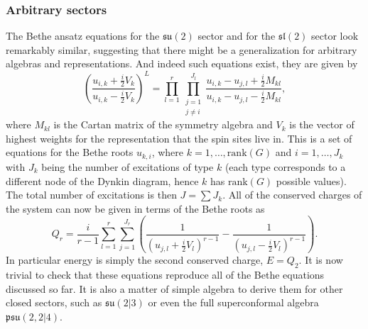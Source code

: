 \subsubsection{Arbitrary sectors}

The Bethe ansatz equations for the $\mathfrak{su}(2)$ sector  and for the $\mathfrak{sl}(2)$ sector  look remarkably similar, suggesting that there might be a generalization for arbitrary algebras and representations.
And indeed such equations exist, they are given by \cite{Saleur:2000kk} 
\begin{equation}
	\left( \frac{u_{i,k} + \frac{i}{2} V_{k}}{u_{i,k} - \frac{i}{2} V_{k}} \right)^L = \prod_{l=1}^r \prod_{\substack{j=1 \\ j \neq i}}^{J_l} \frac{u_{i,k} - u_{j,l} + \frac{i}{2} M_{kl}}{u_{i,k} - u_{j,l} - \frac{i}{2} M_{kl}},
	\label{eq:general_bae}
\end{equation}
where $M_{kl}$ is the Cartan matrix of the symmetry algebra and $V_{k}$ is the vector of highest weights for the representation that the spin sites live in. This is a set of equations for the Bethe roots $u_{k,i}$, where $k=1,\dots,\mathrm{rank}(G)$ and $i = 1,\dots,J_{k}$ with $J_k$ being the number of excitations of type $k$ (each type corresponds to a different node of the Dynkin diagram, hence $k$ has $\mathrm{rank}(G)$ possible values). The total number of excitations is then $J = \sum J_k$. All of the conserved charges of the system can now be given in terms of the Bethe roots as
\begin{equation}
	Q_r = \frac{i}{r-1} \sum_{l=1}^{r} \sum_{j=1}^{J_r} \left( \frac{1}{\left(u_{j,l} + \frac{i}{2} V_{l}\right)^{r-1}} - \frac{1}{\left(u_{j,l} - \frac{i}{2} V_{l}\right)^{r-1}} \right).
\end{equation} 
In particular energy is simply the second conserved charge, $E=Q_2$.
It is now trivial to check that these equations reproduce all of the Bethe equations discussed so far. 
It is also a matter of simple algebra to derive them for other closed sectors, such as  $\mathfrak{su}(2|3)$ or even the full superconformal algebra $\mathfrak{psu}(2,2|4)$.


